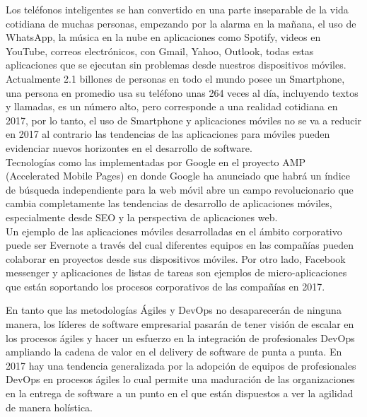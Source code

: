 \begin{multicols}{2}

Los teléfonos inteligentes se han convertido en una parte inseparable de la vida cotidiana de muchas personas, empezando por la alarma en la mañana, el uso de WhatsApp, la música en la nube en aplicaciones como Spotify, videos en YouTube, correos electrónicos, con Gmail, Yahoo, Outlook, todas	estas	aplicaciones	que	se ejecutan sin problemas desde nuestros dispositivos móviles. Actualmente 2.1 billones de personas en todo el mundo posee un Smartphone, una persona en promedio usa su teléfono unas 264 veces al día, incluyendo textos y llamadas, es un número alto, pero corresponde a una realidad cotidiana en 2017, por lo tanto, el uso de Smartphone y aplicaciones móviles no se va a reducir en 2017 al contrario las tendencias de las aplicaciones para móviles pueden evidenciar nuevos horizontes en el desarrollo de software.\\

Tecnologías como las implementadas por Google en el proyecto AMP (Accelerated Mobile Pages) en donde Google ha anunciado que habrá un índice de búsqueda independiente para la web móvil abre un campo revolucionario que cambia completamente las tendencias de desarrollo de aplicaciones móviles, especialmente desde SEO y la perspectiva de aplicaciones web.
\\
Un ejemplo de las aplicaciones móviles desarrolladas en el ámbito corporativo puede ser Evernote a través del cual diferentes equipos en las compañías pueden colaborar en proyectos desde sus dispositivos móviles. Por otro lado, Facebook messenger y aplicaciones de listas de tareas son ejemplos de micro-aplicaciones que están soportando los procesos corporativos de las compañías en 2017.





En tanto que las metodologías Ágiles y DevOps no desaparecerán de ninguna manera, los líderes de software empresarial pasarán de tener visión de escalar en los procesos ágiles y hacer un esfuerzo  en la integración de profesionales DevOps ampliando la cadena de valor en el delivery de software de punta a punta. En 2017 hay una tendencia generalizada por la adopción de equipos de profesionales DevOps en procesos ágiles lo cual permite una maduración de las organizaciones en la entrega de software a un punto en el que están dispuestos a ver la agilidad de manera holística.\\


\end{multicols}
